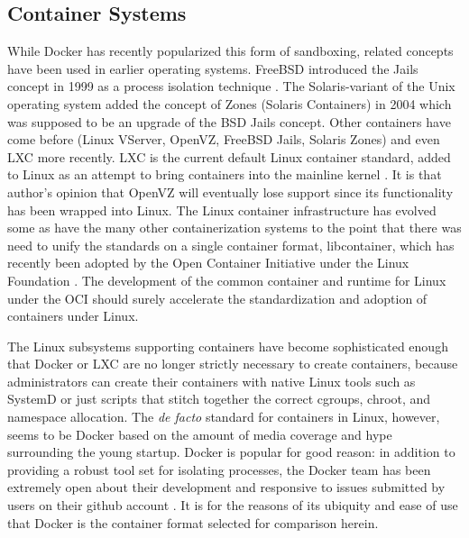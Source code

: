 \subsection{Container Systems}
\label{sec:container_systems}
While Docker has recently popularized this form of sandboxing, related concepts have been used in earlier operating systems.
FreeBSD introduced the Jails concept in 1999 as a process isolation technique \autocite{_zones_1}.  
The Solaris-variant of the Unix operating system added the concept of Zones (Solaris Containers) in 2004 which was supposed to be an upgrade of the BSD Jails concept.  
Other containers have come before (Linux VServer, OpenVZ, FreeBSD Jails, Solaris Zones) and even LXC more recently.  
LXC is the current default Linux container standard, added to Linux as an attempt to bring containers into the mainline kernel \autocite{dockersecurity1}.
It is that author's opinion that OpenVZ will eventually lose support since its functionality has been wrapped into Linux.
The Linux container infrastructure has evolved some as have the many other containerization systems to the point that there was need to unify the standards on a single container format, libcontainer, which has recently been adopted by the Open Container Initiative under the Linux Foundation \autocite{_oci_1}.  
The development of the common container and runtime for Linux under the OCI should surely accelerate the standardization and adoption of containers under Linux.

The Linux subsystems supporting containers have become sophisticated enough that Docker or LXC are no longer strictly necessary to create containers, because administrators can create their containers with native Linux  tools such as SystemD or just scripts that stitch together the correct cgroups, chroot, and namespace allocation.  
The \emph{de facto} standard for containers in Linux, however, seems to be Docker based on the amount of media coverage and hype surrounding the young startup.  
Docker is popular for good reason: in addition to providing a robust tool set for isolating processes, the Docker team has been extremely open about their development and responsive to issues submitted by users on their github account \autocite{githubdocker}.  
It is for the reasons of its ubiquity and ease of use that Docker is the container format selected for comparison herein.

